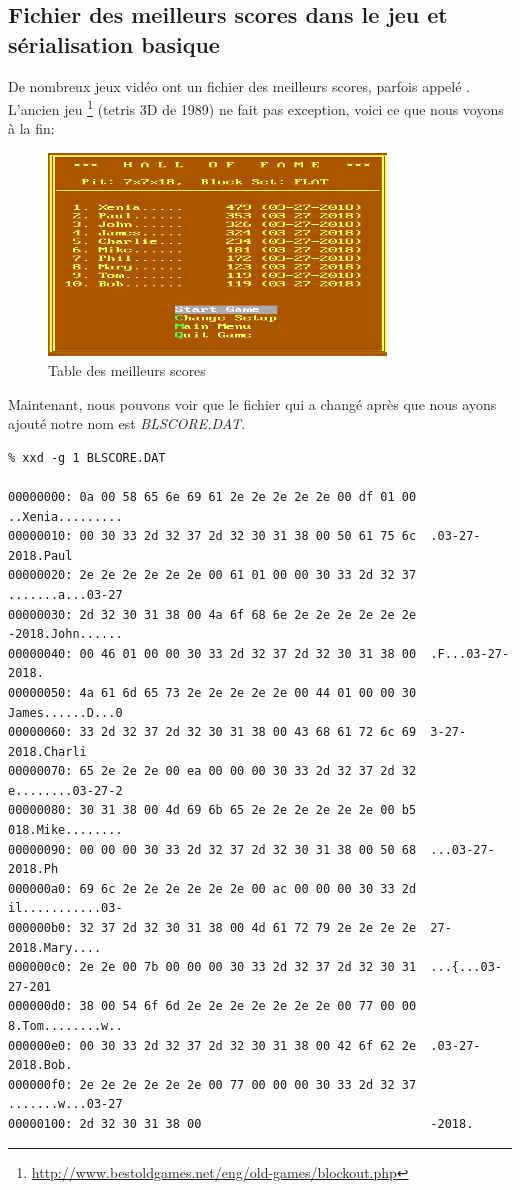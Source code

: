 \subsection{Fichier des meilleurs scores dans le jeu  et sérialisation basique}

De nombreux jeux vidéo ont un fichier des meilleurs scores, parfois appelé .
L'ancien jeu \footnote{\url{http://www.bestoldgames.net/eng/old-games/blockout.php}}
(tetris 3D de 1989) ne fait pas exception, voici ce que nous voyons à la fin:

\begin{figure}[H]
\centering
\includegraphics[width=0.8\textwidth]{advanced/550_more_structs/blockout/hs.png}
\caption{Table des meilleurs scores}
\end{figure}

Maintenant, nous pouvons voir que le fichier qui a changé après que nous ayons ajouté
notre nom est \emph{BLSCORE.DAT}.

\begin{lstlisting}
% xxd -g 1 BLSCORE.DAT

00000000: 0a 00 58 65 6e 69 61 2e 2e 2e 2e 2e 00 df 01 00  ..Xenia.........
00000010: 00 30 33 2d 32 37 2d 32 30 31 38 00 50 61 75 6c  .03-27-2018.Paul
00000020: 2e 2e 2e 2e 2e 2e 00 61 01 00 00 30 33 2d 32 37  .......a...03-27
00000030: 2d 32 30 31 38 00 4a 6f 68 6e 2e 2e 2e 2e 2e 2e  -2018.John......
00000040: 00 46 01 00 00 30 33 2d 32 37 2d 32 30 31 38 00  .F...03-27-2018.
00000050: 4a 61 6d 65 73 2e 2e 2e 2e 2e 00 44 01 00 00 30  James......D...0
00000060: 33 2d 32 37 2d 32 30 31 38 00 43 68 61 72 6c 69  3-27-2018.Charli
00000070: 65 2e 2e 2e 00 ea 00 00 00 30 33 2d 32 37 2d 32  e........03-27-2
00000080: 30 31 38 00 4d 69 6b 65 2e 2e 2e 2e 2e 2e 00 b5  018.Mike........
00000090: 00 00 00 30 33 2d 32 37 2d 32 30 31 38 00 50 68  ...03-27-2018.Ph
000000a0: 69 6c 2e 2e 2e 2e 2e 2e 00 ac 00 00 00 30 33 2d  il...........03-
000000b0: 32 37 2d 32 30 31 38 00 4d 61 72 79 2e 2e 2e 2e  27-2018.Mary....
000000c0: 2e 2e 00 7b 00 00 00 30 33 2d 32 37 2d 32 30 31  ...{...03-27-201
000000d0: 38 00 54 6f 6d 2e 2e 2e 2e 2e 2e 2e 00 77 00 00  8.Tom........w..
000000e0: 00 30 33 2d 32 37 2d 32 30 31 38 00 42 6f 62 2e  .03-27-2018.Bob.
000000f0: 2e 2e 2e 2e 2e 2e 00 77 00 00 00 30 33 2d 32 37  .......w...03-27
00000100: 2d 32 30 31 38 00                                -2018.
\end{lstlisting}

